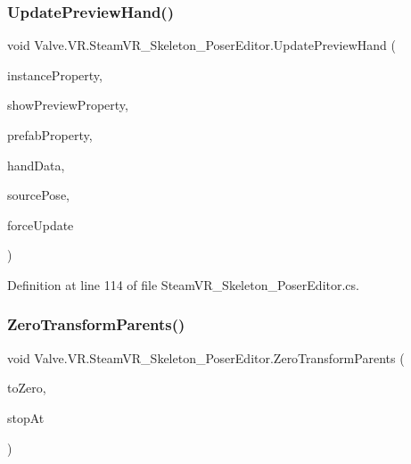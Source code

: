 \subsubsection{\texorpdfstring{UpdatePreviewHand()}{UpdatePreviewHand()}}
{\footnotesize\ttfamily void Valve.\+V\+R.\+Steam\+V\+R\+\_\+\+Skeleton\+\_\+\+Poser\+Editor.\+Update\+Preview\+Hand (\begin{DoxyParamCaption}\item[{Serialized\+Property}]{instance\+Property,  }\item[{Serialized\+Property}]{show\+Preview\+Property,  }\item[{Serialized\+Property}]{prefab\+Property,  }\item[{\mbox{\hyperlink{class_valve_1_1_v_r_1_1_steam_v_r___skeleton___pose___hand}{Steam\+V\+R\+\_\+\+Skeleton\+\_\+\+Pose\+\_\+\+Hand}}}]{hand\+Data,  }\item[{\mbox{\hyperlink{class_valve_1_1_v_r_1_1_steam_v_r___skeleton___pose}{Steam\+V\+R\+\_\+\+Skeleton\+\_\+\+Pose}}}]{source\+Pose,  }\item[{bool}]{force\+Update }\end{DoxyParamCaption})\hspace{0.3cm}{\ttfamily [protected]}}



Definition at line 114 of file Steam\+V\+R\+\_\+\+Skeleton\+\_\+\+Poser\+Editor.\+cs.

\mbox{\label{class_valve_1_1_v_r_1_1_steam_v_r___skeleton___poser_editor_a54013643e240401b627fe5f51123bd69}} 
\subsubsection{\texorpdfstring{ZeroTransformParents()}{ZeroTransformParents()}}
{\footnotesize\ttfamily void Valve.\+V\+R.\+Steam\+V\+R\+\_\+\+Skeleton\+\_\+\+Poser\+Editor.\+Zero\+Transform\+Parents (\begin{DoxyParamCaption}\item[{Transform}]{to\+Zero,  }\item[{Transform}]{stop\+At }\end{DoxyParamCaption})\hspace{0.3cm}{\ttfamily [protected]}}



